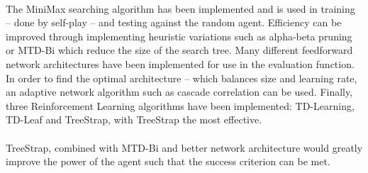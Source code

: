 \documentclass[a4paper]{article}
\begin{document}
\paragraph{} The MiniMax searching algorithm has been implemented and is used in training -- done by self-play -- and testing against the random agent. Efficiency can be improved through implementing heuristic variations such as alpha-beta pruning or MTD-Bi which reduce the size of the search tree. Many different feedforward network architectures have been implemented for use in the evaluation function. In order to find the optimal architecture -- which balances size and learning rate, an adaptive network algorithm such as cascade correlation can be used. Finally, three Reinforcement Learning algorithms have been implemented: TD-Learning, TD-Leaf and TreeStrap, with TreeStrap the most effective.

\paragraph{} TreeStrap, combined with MTD-Bi and better network architecture would greatly improve the power of the agent such that the success criterion can be met.
\end{document}
